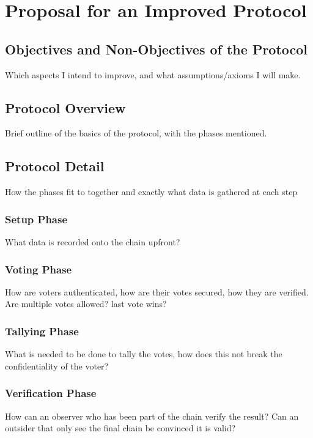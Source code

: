 
\chapter{Proposal for an Improved Protocol}
\label{ch:astris}

\section{Objectives and Non-Objectives of the Protocol}
\label{ch:astris:aims}

Which aspects I intend to improve, and what assumptions/axioms I will make.

\section{Protocol Overview}
\label{ch:astris:overview}

Brief outline of the basics of the protocol, with the phases mentioned.

\section{Protocol Detail}
\label{ch:astris:detail}

How the phases fit to together and exactly what data is gathered at each step

\subsection{Setup Phase}
\label{ch:astris:detail:setup}

What data is recorded onto the chain upfront?

\subsection{Voting Phase}
\label{ch:astris:detail:vote}

How are voters authenticated, how are their votes secured, how they are verified.
Are multiple votes allowed? last vote wins?

\subsection{Tallying Phase}
\label{ch:astris:detail:tally}

What is needed to be done to tally the votes, how does this not break the confidentiality of the voter?

\subsection{Verification Phase}
\label{ch:astris:detail:verify}

How can an observer who has been part of the chain verify the result? Can an outsider that only see the final chain be convinced it is valid?
